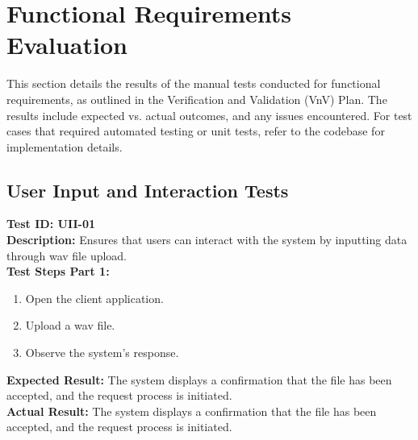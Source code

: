 \documentclass[12pt, titlepage]{article}
\begin{document}
\section{Functional Requirements Evaluation}
This section details the results of the manual tests conducted for functional
requirements, as outlined in the Verification and Validation (VnV) Plan. The
results include expected vs. actual outcomes, and any issues encountered.
For test cases that required automated testing or unit tests, refer to the
codebase for implementation details.

\subsection{User Input and Interaction Tests}
\textbf{Test ID: UII-01}\\
\textbf{Description:} Ensures that users can interact with the system by inputting data through wav file upload.\\
\textbf{Test Steps Part 1:}
\begin{enumerate}
    \item Open the client application.
    \item Upload a wav file.
    \item Observe the system's response.
\end{enumerate}
\textbf{Expected Result:} The system displays a confirmation that the file has been accepted, and the request process is initiated.\\
\textbf{Actual Result:} The system displays a confirmation that the file has been accepted, and the request process is initiated.\\
\end{document}
